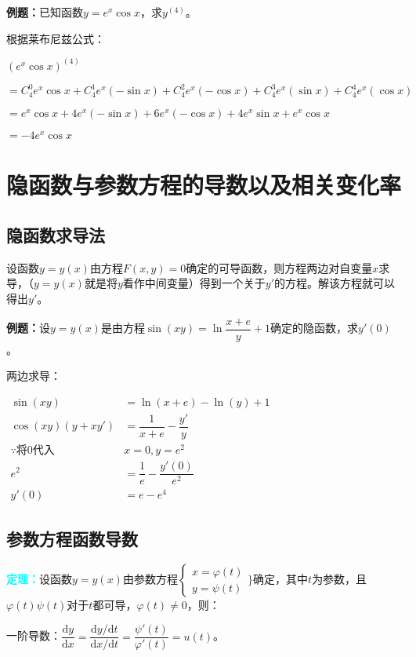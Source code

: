 \documentclass[UTF8, 12pt]{ctexart}
\begin{document}
\textbf{例题：}已知函数$y=e^x\cos x$，求$y^{(4)}$。

根据莱布尼兹公式：

$(e^x\cos x)^{(4)}$

$=C_4^0e^x\cos x+C_4^1e^x(-\sin x)+C_4^2e^x(-\cos x)+C_4^3e^x(\sin x)+C_4^4e^x(\cos x)$

$=e^x\cos x+4e^x(-\sin x)+6e^x(-\cos x)+4e^x\sin x+e^x\cos x$

$=-4e^x\cos x$

\section{隐函数与参数方程的导数以及相关变化率}

\subsection{隐函数求导法}

设函数$y=y(x)$由方程$F(x,y)=0$确定的可导函数，则方程两边对自变量$x$求导，（$y=y(x)$就是将$y$看作中间变量）得到一个关于$y'$的方程。解该方程就可以得出$y'$。

\textbf{例题：}设$y=y(x)$是由方程$\sin(xy)=\ln\dfrac{x+e}{y}+1$确定的隐函数，求$y'(0)$。

两边求导：

$
\begin{aligned}
    \sin(xy) &=\ln(x+e)-\ln(y)+1 \\
    \cos(xy)(y+xy') &=\dfrac{1}{x+e}-\dfrac{y'}{y} \\
    \because\text{将0代入} & x=0, y=e^2 \\
    e^2&=\dfrac{1}{e}-\dfrac{y'(0)}{e^2} \\
    y'(0) & =e-e^4
\end{aligned}
$

\subsection{参数方程函数导数}

\textcolor{aqua}{\textbf{定理：}}设函数$y=y(x)$由参数方程$\left\{
    \begin{array}{l}
        x=\varphi(t) \\
        y=\psi(t)
    \end{array}
\}\right.$确定，其中$t$为参数，且$\varphi(t)\psi(t)$对于$t$都可导，$\varphi(t)\neq 0$，则：

\medskip

一阶导数：$\dfrac{\textrm{d}y}{\textrm{d}x}=\dfrac{\textrm{d}y/\textrm{d}t}{\textrm{d}x/\textrm{d}t}=\dfrac{\psi'(t)}{\varphi'(t)}=u(t)$。
\end{document}
